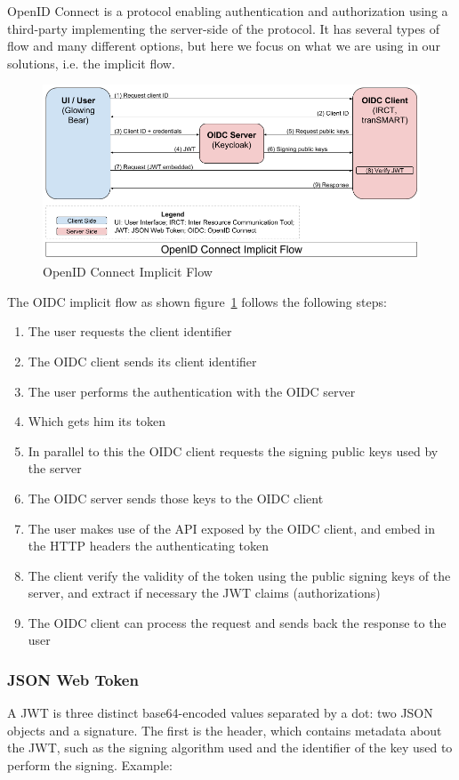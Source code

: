 OpenID Connect is a protocol enabling authentication and authorization using a third-party implementing the server-side of the protocol.
It has several types of flow and many different options, but here we focus on what we are using in our solutions, i.e. the implicit flow.

\begin{figure}[ht]
    \centering
    \includegraphics[width=1\textwidth]{figures/oidc_implicit_flow.png}
    \caption{OpenID Connect Implicit Flow}
    \label{fig:oidcimplicit}
\end{figure}

The OIDC implicit flow as shown figure~\ref{fig:oidcimplicit} follows the following steps:
\begin{enumerate}
    \item The user requests the client identifier
    \item The OIDC client sends its client identifier
    \item The user performs the authentication with the OIDC server
    \item Which gets him its token
    \item In parallel to this the OIDC client requests the signing public keys used by the server
    \item The OIDC server sends those keys to the OIDC client
    \item The user makes use of the API exposed by the OIDC client, and embed in the HTTP headers the authenticating token
    \item The client verify the validity of the token using the public signing keys of the server, and extract if necessary the JWT claims (authorizations)
    \item The OIDC client can process the request and sends back the response to the user
\end{enumerate}


\subsubsection{JSON Web Token}
A JWT is three distinct base64-encoded values separated by a dot: two JSON objects and a signature.
The first is the header, which contains metadata about the JWT, such as the signing algorithm used and the identifier of the key used to perform the signing.
Example:

